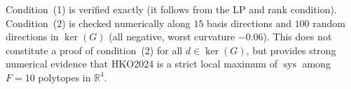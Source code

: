 Condition~(1) is verified exactly (it follows from the LP and rank
condition). Condition~(2) is checked numerically along $15$ basis
directions and $100$ random directions in $\ker(G)$ (all negative,
worst curvature $-0.06$). This does not constitute a proof of
condition~(2) for all $d \in \ker(G)$, but provides strong numerical
evidence that HKO2024 is a strict local maximum of $\operatorname{sys}$
among $F = 10$ polytopes in $\mathbb{R}^4$.
